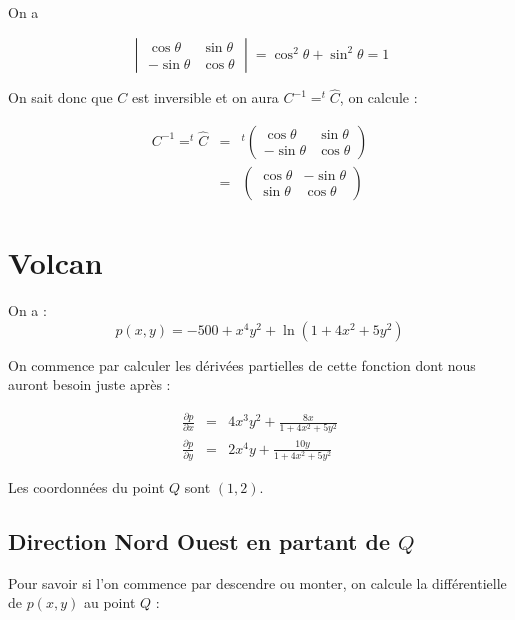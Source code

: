 \documentclass[a4paper, 11pt]{report} %
\begin{document}
\subsection{}

On a

\[
\begin{vmatrix}
\cos\theta& \sin\theta\\
-\sin\theta& \cos\theta
\end{vmatrix} = \cos^2\theta+\sin^2\theta = 1
\]

On sait donc que $C$ est inversible et on aura $C^{-1} = ^t\widehat{C}$, on calcule :

\begin{eqnarray*}
    C^{-1} = ^t\widehat{C} & = &
    ^t\begin{pmatrix}
        \cos\theta& \sin\theta\\
        -\sin\theta& \cos\theta
    \end{pmatrix}\\
    & = &
    \begin{pmatrix}
        \cos\theta& -\sin\theta\\
        \sin\theta& \cos\theta
    \end{pmatrix}
\end{eqnarray*}

\section{Volcan} %

On a : $$p(x,y) = -500 + x^4y^2 + \ln(1+4x^2 + 5y^2)$$

On commence par calculer les dérivées partielles de cette fonction dont nous auront besoin juste après :

\begin{eqnarray*}
    \frac{\partial p}{\partial x} & = & 4x^3y^2 + \frac{8x}{1+4x^2+5y^2}\\
    \frac{\partial p}{\partial y} & = & 2x^4y + \frac{10y}{1+4x^2+5y^2}
\end{eqnarray*}

Les coordonnées du point $Q$ sont $(1,2)$.

\subsection{Direction Nord Ouest en partant de $Q$}

Pour savoir si l'on commence par descendre ou monter, on calcule la différentielle de $p(x,y)$ au point $Q$ :
\end{document}
